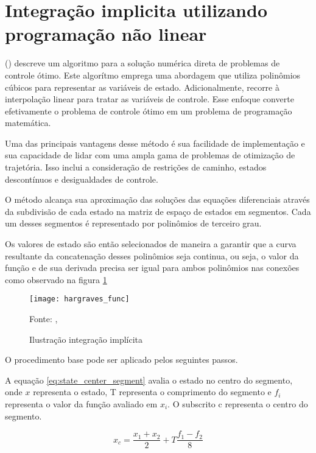 \section{Integração implicita utilizando programação não linear}

\citeauthor{hargraves87} (\citeyear{hargraves87}) descreve um algoritmo para a solução numérica direta de problemas de controle ótimo. 
Este algorítmo emprega uma abordagem que utiliza polinômios cúbicos para representar as variáveis de estado. Adicionalmente, recorre à interpolação linear para tratar as variáveis de controle. 
Esse enfoque converte efetivamente o problema de controle ótimo em um problema de programação matemática.

Uma das principais vantagens desse método é sua facilidade de implementação e sua capacidade de lidar com uma ampla gama de problemas de otimização de trajetória. Isso inclui a consideração de restrições de caminho, estados descontínuos e desigualdades de controle.

O método alcança sua aproximação das soluções das equações diferenciais através da subdivisão de cada estado na matriz de espaço de estados em segmentos. Cada um desses segmentos é representado por polinômios de terceiro grau.

Os valores de estado são então selecionados de maneira a garantir que a curva resultante da concatenação desses polinômios seja continua, ou seja,
o valor da função e de sua derivada precisa ser igual para ambos polinômios nas conexões como observado na figura \ref{fig:hargraves_fun}

\begin{figure}[H]
    \centering
    \caption{Ilustração integração implícita}
    \texttt{[image: hargraves\_func]}

    {\footnotesize Fonte: \citeauthor{hargraves87}, \citeyear{hargraves87}}
    \label{fig:hargraves_fun}
\end{figure}

O procedimento base pode ser aplicado pelos seguintes passos.

A equação \ref{eq:state_center_segment} avalia o estado no centro do segmento, onde $x$ representa o estado, 
T representa o comprimento do segmento e $f_i$ representa o valor da função avaliado em $x_i$.
O subscrito c representa o centro do segmento.

\begin{equation}
    \label{eq:state_center_segment}
    x_c = \frac{x_{1} + x_{2}}{2} + T\frac{f_{1} - f_{2}}{8}
\end{equation}

